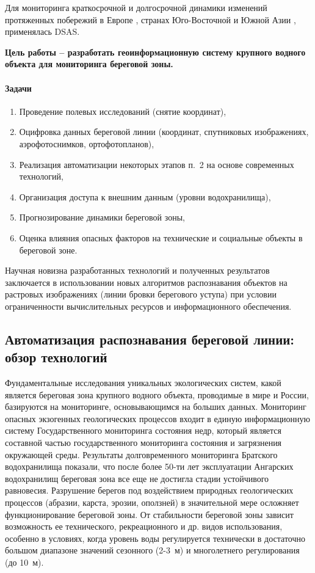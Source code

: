 \documentclass[732,fontsize=14pt,final]{studrep}
\begin{document}
Для мониторинга краткосрочной и долгосрочной динамики изменений протяженных побережий в Европе \cite{kabuth14}, странах Юго-Восточной и Южной Азии \cite{isha20},\cite{matin21} применялась DSAS.

\textbf{Цель работы  -- разработать геоинформационную систему крупного водного объекта для мониторинга береговой зоны.}

\paragraph{Задачи}
\begin{enumerate}
\item Проведение полевых исследований (снятие координат),
\item Оцифровка данных береговой линии (координат, спутниковых изображениях, аэрофотоснимков, ортофотопланов),
\item Реализация автоматизации некоторых этапов п.~2 на основе современных технологий,
\item Организация доступа к внешним данным (уровни водохранилища),
\item Прогнозирование динамики береговой зоны,
\item Оценка влияния опасных факторов на технические и социальные объекты в береговой зоне.
\end{enumerate}

Научная новизна разработанных технологий и полученных результатов заключается в использовании новых алгоритмов распознавания объектов на растровых изображениях (линии бровки берегового уступа) при условии ограниченности вычислительных ресурсов и информационного обеспечения.


\subsection*{Автоматизация распознавания береговой линии: обзор технологий}

Фундаментальные исследования уникальных экологических систем, какой является береговая зона крупного водного объекта, проводимые в мире и России, базируются на мониторинге, основывающимся на больших данных. Мониторинг опасных экзогенных геологических процессов входит в единую информационную систему Государственного мониторинга состояния недр, который является составной частью государственного мониторинга состояния и загрязнения окружающей среды. Результаты долговременного мониторинга Братского водохранилища показали, что после более 50-ти лет эксплуатации Ангарских водохранилищ береговая зона все еще не достигла стадии устойчивого равновесия. Разрушение берегов под воздействием природных геологических процессов (абразии, карста, эрозии, оползней) в значительной мере осложняет функционирование береговой зоны. От стабильности береговой зоны зависит возможность ее технического, рекреационного и др. видов использования, особенно в условиях, когда уровень воды регулируется технически в достаточно большом диапазоне значений сезонного (2-3~м) и многолетнего регулирования (до 10~м).
\end{document}

